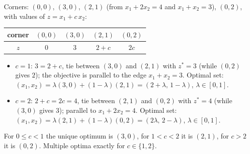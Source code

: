 \begin{solutions}
  \item Corners: $(0,0)$, $(3,0)$, $(2,1)$ (from $x_1+2x_2=4$ and
        $x_1+x_2=3$), $(0,2)$, with values of $z=x_1+c\,x_2$:
        \begin{center}
        \begin{tabular}{c|cccc}
        \hline
        corner & $(0,0)$ & $(3,0)$ & $(2,1)$ & $(0,2)$\\
        \hline
        $z$ & $0$ & $3$ & $2+c$ & $2c$\\
        \hline
        \end{tabular}
        \end{center}
        \begin{itemize}[leftmargin=1.6em,itemsep=0.3ex]
          \item $c=1$: $3=2+c$, tie between $(3,0)$ and $(2,1)$ with
                $z^{*}=3$ (while $(0,2)$ gives $2$); the objective is
                parallel to the edge $x_1+x_2=3$. Optimal set:
                $(x_1,x_2)=\lambda(3,0)+(1-\lambda)(2,1)
                =(2+\lambda,\,1-\lambda)$, $\lambda\in[0,1]$.
          \item $c=2$: $2+c=2c=4$, tie between $(2,1)$ and $(0,2)$ with
                $z^{*}=4$ (while $(3,0)$ gives $3$); parallel to
                $x_1+2x_2=4$. Optimal set:
                $(x_1,x_2)=\lambda(2,1)+(1-\lambda)(0,2)
                =(2\lambda,\,2-\lambda)$, $\lambda\in[0,1]$.
        \end{itemize}
        For $0\le c<1$ the unique optimum is $(3,0)$, for $1<c<2$ it is
        $(2,1)$, for $c>2$ it is $(0,2)$. Multiple optima exactly for
        $c\in\{1,2\}$.
\end{solutions}
